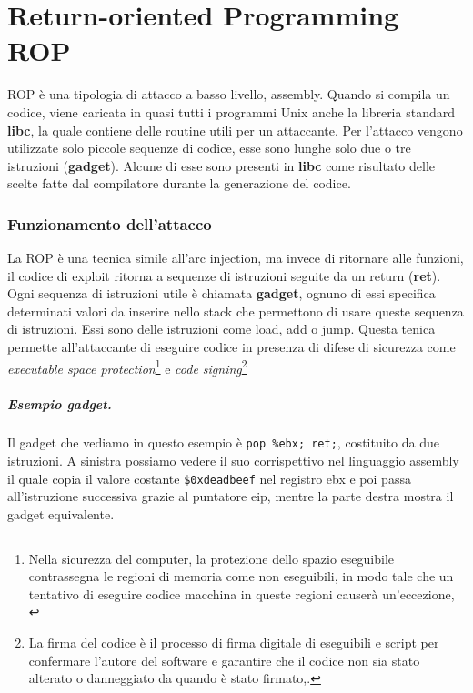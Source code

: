 
\chapter{Return-oriented Programming ROP}
ROP è una tipologia di attacco a basso livello, assembly. Quando si compila un codice, viene caricata in quasi tutti i programmi Unix anche la libreria standard \textbf{libc}, la quale contiene delle routine utili per un attaccante. Per l'attacco vengono utilizzate solo piccole sequenze di codice, esse sono lunghe solo due o tre istruzioni (\textbf{gadget}). Alcune di esse sono presenti in \textbf{libc} come risultato delle scelte fatte dal compilatore durante la generazione del codice. 

\subsection{Funzionamento dell'attacco}
La ROP è una tecnica simile all'arc injection, ma invece di ritornare alle funzioni, il codice di exploit ritorna a sequenze di istruzioni seguite da un return (\textbf{ret}).
Ogni sequenza di istruzioni utile è chiamata \textbf{gadget}, ognuno di essi specifica determinati valori da inserire nello stack che permettono di usare queste sequenza di istruzioni. Essi sono delle istruzioni come load, add o jump. Questa tenica permette all'attaccante di eseguire codice in presenza di difese di sicurezza come \textit{executable space protection}\footnote{ Nella sicurezza del computer, la protezione dello spazio eseguibile contrassegna le regioni di memoria come non eseguibili, in modo tale che un tentativo di eseguire codice macchina in queste regioni causerà un'eccezione, \cite{enwiki:1079234448}} e \textit{code signing}\footnote{La firma del codice è il processo di firma digitale di eseguibili e script per confermare l'autore del software e garantire che il codice non sia stato alterato o danneggiato da quando è stato firmato,\cite{enwiki:1076823321}.}

\paragraph{Esempio gadget.} Il gadget che vediamo in questo esempio è \verb|pop %ebx; ret;|, costituito da due istruzioni. A sinistra possiamo vedere il suo corrispettivo nel linguaggio assembly il quale copia il valore costante \verb|$0xdeadbeef| nel registro ebx e poi passa all'istruzione successiva grazie al puntatore eip, mentre la parte destra mostra il gadget equivalente. 


